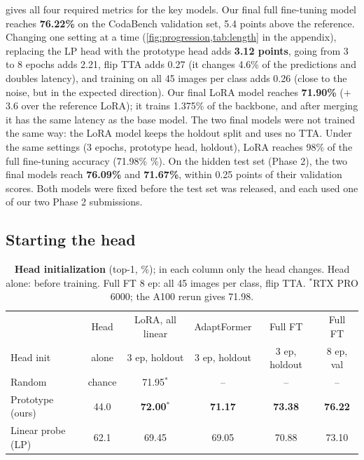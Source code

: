  gives all four required metrics for the key models.
Our final full fine-tuning model reaches \textbf{76.22\%} on the CodaBench validation set, 5.4 points above the reference.
Changing one setting at a time (\cref{fig:progression,tab:length} in the appendix), replacing the LP head with the prototype head adds \textbf{3.12 points}, going from 3 to 8 epochs adds 2.21, flip TTA adds 0.27 (it changes 4.6\% of the predictions and doubles latency), and training on all 45 images per class adds 0.26 (close to the noise, but in the expected direction).
Our final LoRA model reaches \textbf{71.90\%} ($+$3.6 over the reference LoRA); it trains 1.375\% of the backbone, and after merging it has the same latency as the base model.
The two final models were not trained the same way: the LoRA model keeps the holdout split and uses no TTA.
Under the same settings (3 epochs, prototype head, holdout), LoRA reaches 98\% of the full fine-tuning accuracy (71.98\% \%).
On the hidden test set (Phase 2), the two final models reach \textbf{76.09\%} and \textbf{71.67\%}, within 0.25 points of their validation scores.
Both models were fixed before the test set was released, and each used one of our two Phase 2 submissions.

\subsection{Starting the head}
\label{sec:ablation-head}

\begin{table}[t]
  \caption{\textbf{Head initialization} (top-1, \%); in each column only the head changes. Head alone: before training. Full FT 8 ep: all 45 images per class, flip TTA. $^*$RTX PRO 6000; the A100 rerun gives 71.98.}
  \label{tab:head}
  \centering
  \footnotesize
  \setlength{\tabcolsep}{5pt}
  \begin{tabular}{@{}lccccc@{}}
    \toprule
    & Head & LoRA, all linear & AdaptFormer & Full FT & Full FT \\
    Head init & alone & 3 ep, holdout & 3 ep, holdout & 3 ep, holdout & 8 ep, val \\
    \midrule
    Random & chance & 71.95$^*$ & -- & -- & -- \\
    Prototype (ours) & 44.0 & \textbf{72.00}$^*$ & \textbf{71.17} & \textbf{73.38} & \textbf{76.22} \\
    Linear probe (LP) & 62.1 & 69.45 & 69.05 & 70.88 & 73.10 \\
    \bottomrule
  \end{tabular}
\end{table}

